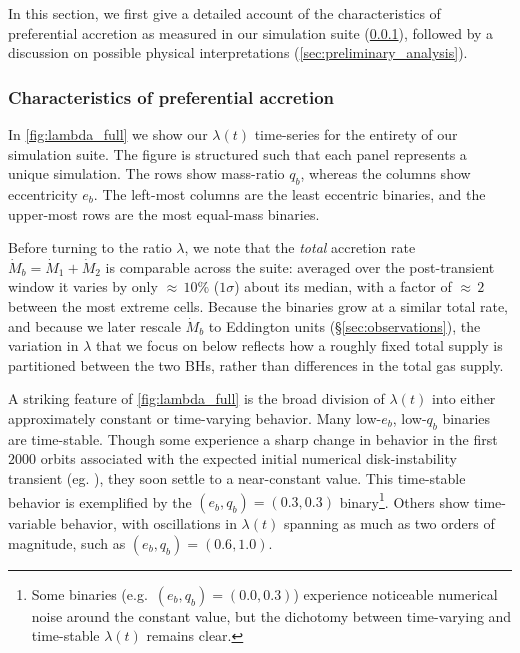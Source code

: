 \documentclass[fleqn,usenatbib]{mnras}
\begin{document}
In this section, we first give a detailed account of the characteristics of preferential accretion as measured in our simulation suite (\ref{subsec:prefer-describe}), followed by a discussion on possible physical interpretations (\ref{sec:preliminary_analysis}).

\subsubsection{Characteristics of preferential accretion} \label{subsec:prefer-describe}

In \autoref{fig:lambda_full} we show our $\lambda(t)$ time-series for the entirety of our simulation suite. The figure is structured such that each panel represents a unique simulation. The rows show mass-ratio $q_b$, whereas the columns show eccentricity $e_b$. The left-most columns are the least eccentric binaries, and the upper-most rows are the most equal-mass binaries.

Before turning to the ratio $\lambda$, we note that the \textit{total} accretion rate $\dot{M}_b = \dot{M}_1 + \dot{M}_2$ is comparable across the suite: averaged over the post-transient window it varies by only ${\approx}\,10\%$ ($1\sigma$) about its median, with a factor of ${\approx}\,2$ between the most extreme cells. Because the binaries grow at a similar total rate, and because we later rescale $\dot{M}_b$ to Eddington units (\S\ref{sec:observations}), the variation in $\lambda$ that we focus on below reflects how a roughly fixed total supply is partitioned between the two BHs, rather than differences in the total gas supply.

A striking feature of \autoref{fig:lambda_full} is the broad division of $\lambda(t)$ into either approximately constant or time-varying behavior. Many low-$e_b$, low-$q_b$ binaries are time-stable. Though some experience a sharp change in behavior in the first $2000$ orbits associated with the expected initial numerical disk-instability transient (eg. \citealt{moriwaki_04}), they soon settle to a near-constant value. This time-stable behavior is exemplified by the $(e_b, q_b) = (0.3, 0.3)$ binary\footnote{Some binaries (e.g.\ $(e_b, q_b) = (0.0, 0.3)$) experience noticeable numerical noise around the constant value, but the dichotomy between time-varying and time-stable $\lambda(t)$ remains clear.}. Others show time-variable behavior, with oscillations in $\lambda(t)$ spanning as much as two orders of magnitude, such as $(e_b, q_b) = (0.6, 1.0)$.
\end{document}
